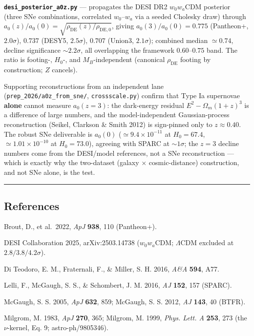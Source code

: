 \documentclass[
]{article}
\begin{document}
\textbf{\texttt{desi\_posterior\_a0z.py}} --- propagates the DESI DR2
\(w_0w_a\)CDM posterior (three SNe combinations, correlated
\(w_0\)--\(w_a\) via a seeded Cholesky draw) through
\(a_0(z)/a_0(0)=\sqrt{\rho_\mathrm{DE}(z)/\rho_\mathrm{DE,0}}\), giving
\(a_0(3)/a_0(0)=0.775\) (Pantheon+, \(2.0\sigma\)), \(0.737\) (DESY5,
\(2.5\sigma\)), \(0.707\) (Union3, \(2.1\sigma\)); combined median
\(\simeq0.74\), decline significance \(\sim2.2\sigma\), all overlapping
the framework \(0.60\)--\(0.75\) band. The ratio is footing-, \(H_0\)-,
and \(M_B\)-independent (canonical \(\rho_\mathrm{DE}\) footing by
construction; \(Z\) cancels).

Supporting reconstructions from an independent lane
(\texttt{prep\_2026/a0z\_from\_sne/}, \texttt{crossscale.py}) confirm
that Type Ia supernovae \textbf{alone} cannot measure \(a_0(z=3)\): the
dark-energy residual \(E^2-\Omega_m(1+z)^3\) is a difference of large
numbers, and the model-independent Gaussian-process reconstruction
(Seikel, Clarkson \& Smith 2012) is sign-pinned only to
\(z\approx0.40\). The robust SNe deliverable is \(a_0(0)\)
(\(\simeq9.4\times10^{-11}\) at \(H_0=67.4\),
\(\simeq1.01\times10^{-10}\) at \(H_0=73.0\)), agreeing with SPARC at
\(\sim1\sigma\); the \(z=3\) decline numbers come from the DESI/model
references, not a SNe reconstruction --- which is exactly why the
two-dataset (galaxy \(\times\) cosmic-distance) construction, and not
SNe alone, is the test.

\begin{center}\rule{0.5\linewidth}{0.5pt}\end{center}

\subsection{References}\label{references}

Brout, D., et al.~2022, \emph{ApJ} \textbf{938}, 110 (Pantheon+).

DESI Collaboration 2025, arXiv:2503.14738 (\(w_0w_a\)CDM; \(\Lambda\)CDM
excluded at \(2.8/3.8/4.2\sigma\)).

Di Teodoro, E. M., Fraternali, F., \& Miller, S. H. 2016, \emph{A\&A}
\textbf{594}, A77.

Lelli, F., McGaugh, S. S., \& Schombert, J. M. 2016, \emph{AJ}
\textbf{152}, 157 (SPARC).

McGaugh, S. S. 2005, \emph{ApJ} \textbf{632}, 859; McGaugh, S. S. 2012,
\emph{AJ} \textbf{143}, 40 (BTFR).

Milgrom, M. 1983, \emph{ApJ} \textbf{270}, 365; Milgrom, M. 1999,
\emph{Phys. Lett. A} \textbf{253}, 273 (the \(\nu\)-kernel, Eq. 9;
astro-ph/9805346).
\end{document}
